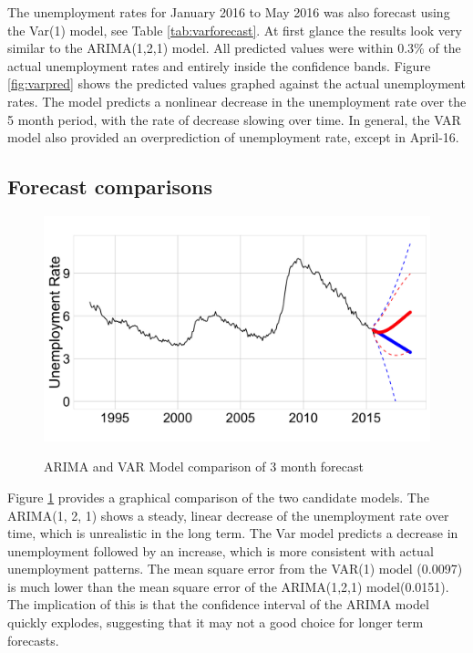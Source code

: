 \documentclass[twoside,twocolumn]{article}
\begin{document}
The unemployment rates for January 2016 to May 2016 was also forecast using the Var(1) model, see Table \ref{tab:varforecast}.  At first glance the results look very similar to the ARIMA(1,2,1) model. All predicted values were within 0.3\% of the actual unemployment rates and entirely inside the confidence bands.  Figure \ref{fig:varpred} shows the predicted values graphed against the actual unemployment rates. The model predicts a nonlinear decrease in the unemployment rate over the 5 month period, with the rate of decrease slowing over time.  In general, the VAR model also provided an overprediction of unemployment rate, except in April-16. 

 \subsection{Forecast comparisons}
    \begin{figure}[htb]
    	\centering
     	\caption{ARIMA and VAR Model comparison of 3 month forecast}
     	\includegraphics[width=\linewidth]{images/arimavarforecast}
     	\label{fig:arimavarforecast}
 \end{figure}
 
 
      Figure \ref{fig:arimavarforecast} provides a graphical comparison of the two candidate models.  The ARIMA(1, 2, 1) shows a steady, linear decrease of the unemployment rate over time, which is unrealistic in the long term.  The Var model predicts a decrease in unemployment followed by an increase, which is more consistent with actual unemployment patterns. The mean square error from the VAR(1) model (0.0097) is much lower than the mean square error of the ARIMA(1,2,1) model(0.0151). The implication of this is that  the confidence interval of the ARIMA model quickly explodes, suggesting that it may not a good choice for longer term forecasts.
      
\end{document}
